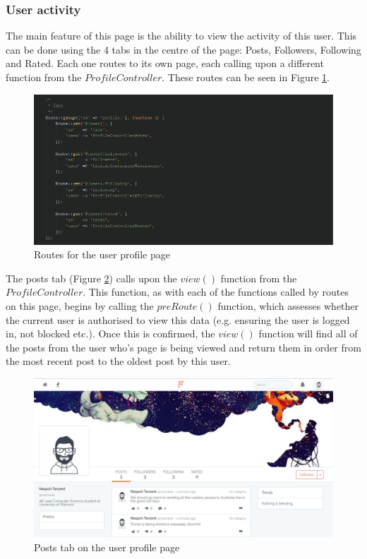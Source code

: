\subsubsection{User activity}
The main feature of this page is the ability to view the activity of this user. This can be done using the 4 tabs in the centre of the page: Posts, Followers, Following and Rated. Each one routes to its own page, each calling upon a different function from the \(ProfileController\). These routes can be seen in Figure \ref{fig:ProfileRouting}.

\begin{figure}[H]
\centering
\includegraphics[width=\textwidth]{Images/Implementation/ProfileRouting}
\caption{Routes for the user profile page}
\label{fig:ProfileRouting}
\end{figure}

The posts tab (Figure \ref{fig:ProfilePosts}) calls upon the \(view()\) function from the \(ProfileController\). This function, as with each of the functions called by routes on this page, begins by calling the \(preRoute()\) function, which assesses whether the current user is authorised to view this data (e.g. ensuring the user is logged in, not blocked etc.). Once this is confirmed, the \(view()\) function will find all of the posts from the user who's page is being viewed and return them in order from the most recent post to the oldest post by this user.

\begin{figure}[H]
\centering
\includegraphics[width=\textwidth]{Images/Implementation/ProfilePosts}
\caption{Posts tab on the user profile page}
\label{fig:ProfilePosts}
\end{figure}

